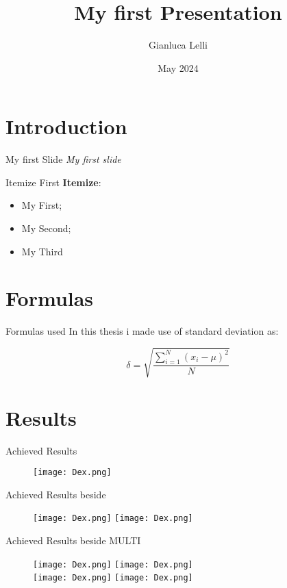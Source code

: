 \documentclass{beamer}
\title{My first Presentation}
\author{Gianluca Lelli}
\date{May 2024}
\begin{document}
\maketitle

\section{Introduction}
\begin{frame}{My first Slide}
    \textit{My first slide}
\end{frame}

\begin{frame}{Itemize}
\large{First \textbf{Itemize}:}

    \begin{itemize}
         \item My First;
         \item My Second;
         \item My Third
    \end{itemize}
\end{frame}

\section{Formulas}
\begin{frame}{Formulas used}
In this thesis i made use of standard deviation as:

\bigskip
    \begin{equation}
        \delta =\sqrt{\frac{\displaystyle\sum_{i=1}^N(x_i-\mu)^2}{N}}
    \end{equation}
\end{frame}





\section{Results}
\begin{frame}{Achieved Results}
    \begin{figure}
        \centering
        \texttt{[image: Dex.png]}
    \end{figure}
\end{frame}


\begin{frame}{Achieved Results beside}
    \begin{figure}
        \centering
        \texttt{[image: Dex.png]}
        \texttt{[image: Dex.png]}
    \end{figure}
\end{frame}


\begin{frame}{Achieved Results beside MULTI}
    \begin{figure}
        \centering
        \texttt{[image: Dex.png]}
        \texttt{[image: Dex.png]} \\ %
        \texttt{[image: Dex.png]}
        \texttt{[image: Dex.png]} 
    \end{figure}
\end{frame}
\end{document}
